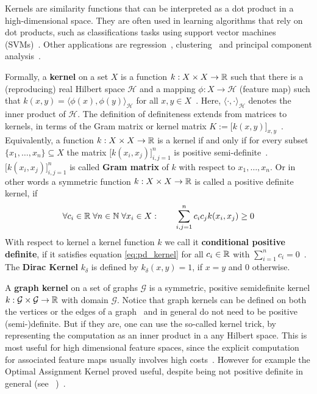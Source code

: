 	Kernels are similarity functions that can be interpreted as a dot product in a high-dimensional space.
	They are often used in learning algorithms that rely on dot products, such as classifications tasks using support vector machines (SVMs)~\cite{2002_Scholkopf_CONF, 2019_Togninalli_NIPS}.
	Other applications are regression~\cite{1996_Drucker_CONF}, clustering~\cite{1996_Vapnik_CONF} and principal component analysis~\cite{1997_Schoelkopf_CONF}.
	
	Formally, a \textbf{kernel} on a set $X$ is a function $k:X\times X \to\mathbb{R}$ such that there is a (reproducing) real Hilbert space $\mathcal{H}$ and a mapping $\phi:X\to\mathcal{H}$ (feature map) such that $k(x,y) = \langle \phi(x), \phi(y) \rangle_\mathcal{H}$ for all $x, y\in X$~\cite{1999_Haussler_CONF, 2008_Hofmann_CONF}. 
	Here, $\langle \cdot,\cdot \rangle_\mathcal{H}$ denotes the inner product of $\mathcal{H}$.
	The definition of definiteness extends from matrices to kernels, in terms of the Gram matrix or kernel matrix $K:=\big[ k(x, y) \big]_{x, y}$~\cite{2008_Hofmann_CONF}.
	Equivalently, a function $k:X\times X\to\mathbb{R}$ is a kernel if and only if for every subset $\{x_1, \dots, x_n\}\subseteq X$ the matrix $\big[k(x_i, x_j)\big]^n_{i,j=1}$ is positive semi-definite~\cite{2016_Kriege_NIPS, 2019_Togninalli_NIPS}.
	$\big[k(x_i, x_j)\big]^n_{i,j=1}$ is called \textbf{Gram matrix} of $k$ with respect to $x_1, \dots, x_n$.
	Or in other words a symmetric function $k:X\times X\to\mathbb{R}$ is called a positive definite kernel, if
	\begin{equation} \label{eq:pd_kernel}
		\forall c_i\in\mathbb{R} \; \forall n\in\mathbb{N} \; \forall x_i\in X:\qquad \sum_{i,j=1}^{n} c_i c_j k(x_i, x_j) \ge 0
	\end{equation}
	With respect to kernel a kernel function $k$ we call it \textbf{conditional positive definite}, if it satisfies equation \ref{eq:pd_kernel} for all $c_i\in\mathbb{R}$ with $\sum_{i=1}^{n} c_i = 0$~\cite{2019_Togninalli_NIPS}.
	The \textbf{Dirac Kernel} $k_{\delta}$ is defined by $k_{\delta}(x,y)=1$, if $x=y$ and $0$ otherwise.
	
	A \textbf{graph kernel} on a set of graphs $\mathcal{G}$ is a symmetric, positive semidefinite kernel $k:\mathcal{G}\times \mathcal{G}\to \mathbb{R}$ with domain $\mathcal{G}$.
	Notice that graph kernels can be defined on both the vertices or the edges of a graph~\cite{2008_Hofmann_CONF} and in general do not need to be positive (semi-)definite.	
	But if they are, one can use the so-called kernel trick, by representing the computation as an inner product in a any Hilbert space.
	This is most useful for high dimensional feature spaces, since the explicit computation for associated feature maps usually involves high costs~\cite{2003_Gaertner_CONF}.
	However for example the Optimal Assignment Kernel proved useful, despite being not positive definite in general (see ~\cite{2005_Froehlich_ICML})~\cite{2018_Vert_CONF}.
	
